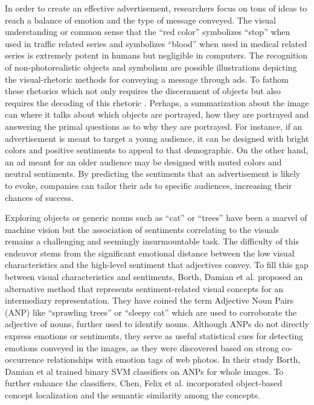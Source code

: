 \documentclass[conference]{IEEEtran}
\begin{document}
In order to create an effective advertisement, researchers focus on tons of ideas to reach a balance of emotion and the type of message conveyed. The visual understanding or common sense that the “red color” symbolizes “stop” when used in traffic related series and symbolizes “blood” when used in medical related series is extremely potent in humans but negligible in computers. The recognition of non-photorealistic objects and symbolism are possible illustrations depicting the visual-rhetoric methods for conveying a message through ads. To fathom these rhetorics which not only requires the discernment of objects but also requires the decoding of this rhetoric \cite{b4} \cite{b5}. Perhaps, a summarization about the image can where it talks about \cite{b6} \cite{b7} which objects are portrayed, how they are portrayed and answering the primal questions as to why they are portrayed. For instance, if an advertisement is meant to target a young audience, it can be designed with bright colors and positive sentiments to appeal to that demographic. On the other hand, an ad meant for an older audience may be designed with muted colors and neutral sentiments. By predicting the sentiments that an advertisement is likely to evoke, companies can tailor their ads to specific audiences, increasing their chances of success.

Exploring objects or generic nouns such as “cat” or “trees” have been a marvel of machine vision but the association of sentiments correlating to the visuals remains a challenging and seemingly insurmountable task. The difficulty of this endeavor stems from the significant emotional distance between the low visual characteristics and the high-level sentiment that adjectives convey. To fill this gap between visual characteristics and sentiments, Borth, Damian et al. \cite{b8} proposed an alternative method that represents sentiment-related visual concepts for an intermediary  representation. They have coined the term Adjective Noun Pairs (ANP) like “sprawling trees” or “sleepy cat” which are used to corroborate the adjective of nouns, further used to identify nouns. Although ANPs do not directly express emotions or sentiments, they serve as useful statistical cues for detecting emotions conveyed in the images, as they were discovered based on strong co-occurrence relationships with emotion tags of web photos. In their study Borth, Damian et al \cite{b8} trained binary SVM classifiers on ANPs for whole images. To further enhance the classifiers, Chen, Felix et al. \cite{b9} incorporated object-based concept localization and the semantic similarity among the concepts. 
\end{document}
